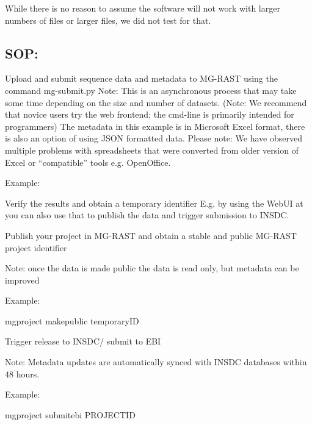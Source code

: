 \documentclass[letterpaper,10pt,english]{sphinxmanual}
\begin{document}
While there is no reason to assume the software will not work with
larger numbers of files or larger files, we did not test for that.


\subsection{SOP:}
\label{\detokenize{user_manual:sop}}
Upload and submit sequence data and metadata to MG-RAST using the
command mg-submit.py Note: This is an asynchronous process that may take
some time depending on the size and number of datasets. (Note: We
recommend that novice users try the web frontend; the cmd-line is
primarily intended for programmers) The metadata in this example is in
Microsoft Excel format, there is also an option of using JSON formatted
data. Please note: We have observed multiple problems with spreadsheets
that were converted from older version of Excel or “compatible” tools
e.g. OpenOffice.

Example:

\begin{sphinxVerbatim}[commandchars=\\\{\}]
      
\end{sphinxVerbatim}

Verify the results and obtain a temporary identifier E.g. by using the
WebUI at  \textendash{} you can also use that to publish the data
and trigger submission to INSDC.

Publish your project in MG-RAST and obtain a stable and public MG-RAST
project identifier

Note: once the data is made public the data is read only, but metadata
can be improved

Example:

\begin{sphinxVerbatim}[commandchars=\\\{\}]
mg\PYGZhy{}project make\PYGZhy{}public \PYGZdl{}temporary\PYGZus{}ID
\end{sphinxVerbatim}

Trigger release to INSDC/ submit to EBI

Note: Metadata updates are automatically synced with INSDC databases
within 48 hours.

Example:

\begin{sphinxVerbatim}[commandchars=\\\{\}]
mg\PYGZhy{}project submit\PYGZhy{}ebi \PYGZdl{}PROJECT\PYGZus{}ID
\end{sphinxVerbatim}
\end{document}
